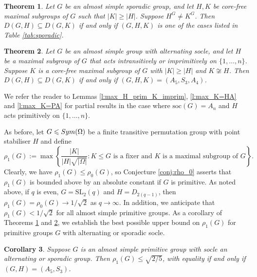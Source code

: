 \documentclass[twoside,a4paper,reqno,11pt]{amsart}
\renewcommand{\O}{\Omega}
\newcommand{\<}{\langle}
\renewcommand{\>}{\rangle}
\renewcommand{\to}{\rightarrow}
\newcommand{\leqs}{\leqslant}
\newcommand{\geqs}{\geqslant}
\newcommand{\soc}{\mathrm{soc}}
\newcommand{\PSL}{\mathrm{PSL}}
\newcommand{\GL}{\mathrm{GL}}
\newcommand{\SL}{\mathrm{SL}}
\newtheorem{theorem}{Theorem}
\newtheorem{corol}[theorem]{Corollary}
\theoremstyle{definition}
\begin{document}
	\begin{theorem}
		\label{thm:spo}
		Let $G$ be an almost simple sporadic group, and let $H,K$ be core-free maximal subgroups of $G$ such that $|K|\geqs |H|$. Suppose $H^G\ne K^G$. Then $D(G,H)\subseteq D(G,K)$ if and only if $(G,H,K)$ is one of the cases listed in Table \ref{tab:sporadic}.
	\end{theorem}
	
	\begin{theorem}
		\label{thm:alt}
		Let $G$ be an almost simple group with alternating socle, and let $H$ be a maximal subgroup of $G$ that acts intransitively or imprimitively on $\{1,\dots,n\}$. Suppose $K$ is a core-free maximal subgroup of $G$ with $|K|\geqs |H|$ and $K\not\cong H$. Then $D(G,H)\subseteq D(G,K)$ if and only if $(G,H,K) = (A_5,S_3,A_4)$.
	\end{theorem}
	
	We refer the reader to Lemmas \ref{l:max_H_prim_K_imprim}, \ref{l:max_K=HA} and \ref{l:max_K=PA} for partial results in the case where $\soc(G) = A_n$ and $H$ acts primitively on $\{1,\dots,n\}$.
	
	As before, let $G \leqs {\rm Sym}(\O)$ be a finite transitive permutation group with point stabiliser $H$ and define
	\begin{equation*}
	\rho_1(G) := \max\left\{\frac{|K|}{|H|\sqrt{|\Omega|}}:\mbox{$K \leqs G$ is a fixer and $K$ is a maximal subgroup of $G$}\right\}.
	\end{equation*}
	Clearly, we have $\rho_1(G)\leqs \rho_0(G)$, so 
	Conjecture \ref{conj:rho_0} asserts that $\rho_1(G)$ is bounded above by an absolute constant if $G$ is primitive. As noted above, if $q$ is even, $G = \SL_2(q)$ and $H = D_{2(q-1)}$, then $\rho_1(G) = \rho_0(G)\to 1/\sqrt{2}$ as $q\to \infty$. In addition, we anticipate that $\rho_1(G) < 1/\sqrt{2}$ for all almost simple primitive groups. As a corollary of Theorems \ref{thm:spo} and \ref{thm:alt}, we establish the best possible upper bound on $\rho_1(G)$ for primitive groups $G$ with alternating or sporadic socle.
	
	\begin{corol}
		\label{cor:rho_1_An}
		Suppose $G$ is an almost simple primitive group with socle an alternating or sporadic group. Then $\rho_1(G) \leqs \sqrt{2/5}$, with equality if and only if $(G,H) = (A_5,S_3)$.
	\end{corol}
	
\end{document}
